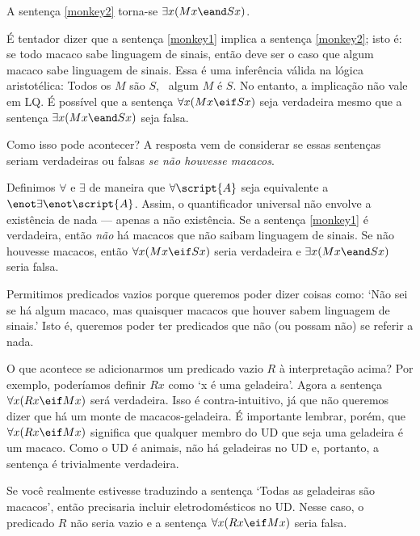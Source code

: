 A sentença \ref{monkey2} torna-se $\exists x(Mx \eand Sx)$.

É tentador dizer que a sentença \ref{monkey1} implica a sentença \ref{monkey2}; isto é: se todo macaco sabe linguagem de sinais, então deve ser o caso que algum macaco sabe linguagem de sinais. Essa é uma inferência válida na lógica aristotélica: Todos os $M$ são $S$, \therefore\ algum $M$ é $S$. No entanto, a implicação não vale em LQ. É possível que a sentença $\forall x(Mx \eif Sx)$ seja verdadeira mesmo que a sentença $\exists x(Mx \eand Sx)$ seja falsa.

Como isso pode acontecer? A resposta vem de considerar se essas sentenças seriam verdadeiras ou falsas \emph{se não houvesse macacos}.

Definimos $\forall$ e $\exists$ de maneira que $\forall\script{A}$ seja equivalente a $\enot \exists\enot \script{A}$. Assim, o quantificador universal não envolve a existência de nada — apenas a não existência. Se a sentença \ref{monkey1} é verdadeira, então \emph{não} há macacos que não saibam linguagem de sinais. Se não houvesse macacos, então $\forall x(Mx \eif Sx)$ seria verdadeira e $\exists x(Mx \eand Sx)$ seria falsa.

Permitimos predicados vazios porque queremos poder dizer coisas como: `Não sei se há algum macaco, mas quaisquer macacos que houver sabem linguagem de sinais.' Isto é, queremos poder ter predicados que não (ou possam não) se referir a nada.

O que acontece se adicionarmos um predicado vazio $R$ à interpretação acima? Por exemplo, poderíamos definir $Rx$ como `x é uma geladeira'. Agora a sentença $\forall x(Rx \eif Mx)$ será verdadeira. Isso é contra-intuitivo, já que não queremos dizer que há um monte de macacos-geladeira. É importante lembrar, porém, que $\forall x(Rx \eif Mx)$ significa que qualquer membro do UD que seja uma geladeira é um macaco. Como o UD é animais, não há geladeiras no UD e, portanto, a sentença é trivialmente verdadeira.

Se você realmente estivesse traduzindo a sentença `Todas as geladeiras são macacos', então precisaria incluir eletrodomésticos no UD. Nesse caso, o predicado $R$ não seria vazio e a sentença $\forall x(Rx \eif Mx)$ seria falsa.

\begin{table}[h!]
\end{table}

